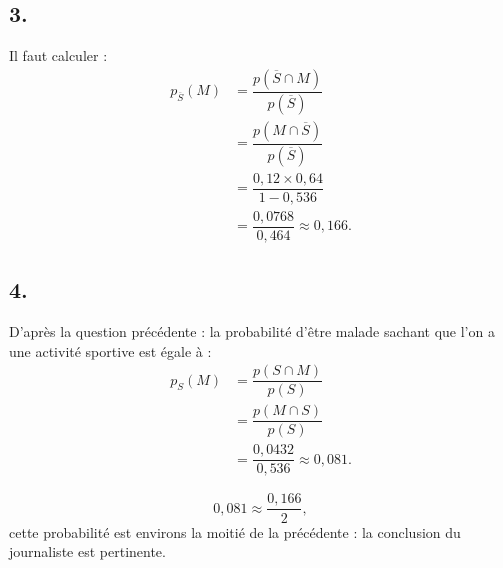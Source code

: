 \documentclass[10pt]{article}
\begin{document}
\subsection*{3.} Il faut calculer :
\begin{align*}
p_{\overline{S}}(M) &= \dfrac{p(\overline{S} \cap M)}{p(\overline{S})} \\
&= \dfrac{p(M \cap \overline{S})}{p(\overline{S})} \\
&= \dfrac{0{,}12 \times 0{,}64}{1 - 0{,}536} \\
&= \dfrac{0{,}0768}{0{,}464} \approx 0{,}166.
\end{align*}

\subsection*{4.} D'après la question précédente : la probabilité d'être malade sachant que l'on a une activité sportive est égale à :
\begin{align*}
p_S(M) &= \dfrac{p(S \cap M)}{p(S)} \\
&= \dfrac{p(M \cap S)}{p(S)} \\
&= \dfrac{0{,}0432}{0{,}536} \approx 0{,}081. 
\end{align*}

\[
0{,}081 \approx \dfrac{0{,}166}{2},
\]
cette probabilité est environs la moitié de la précédente : la conclusion du journaliste est pertinente.
\end{document}
